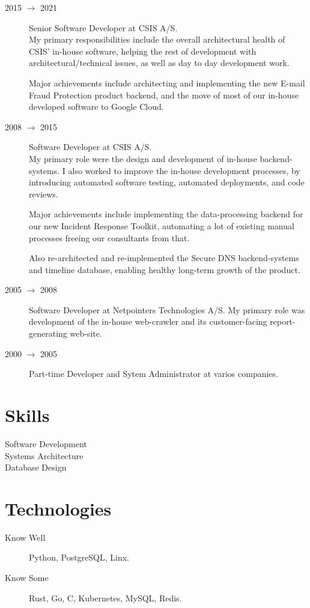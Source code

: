 \documentclass[margin,line,a4paper]{resume}
\begin{document}
\begin{resume}
\begin{description}
\item[2015 $\rightarrow$ 2021] Senior Software Developer at CSIS A/S. \\
My primary responsibilities include the overall architectural health of CSIS'
in-house software, helping the rest of development with
architectural/technical issues, as well as day to day development work.

Major achievements include architecting and implementing the new
E-mail Fraud Protection product backend, and the move of most of our in-house
developed software to Google Cloud.

\item[2008 $\rightarrow$ 2015] Software Developer at CSIS A/S. \\
My primary role were the design and development of in-house backend-systems.
I also worked to improve the in-house development processes, by introducing
automated software testing, automated deployments, and code reviews.

Major achievements include implementing the data-processing backend for our
new Incident Response Toolkit, automating a lot of existing manual processes
freeing our consultants from that.

Also re-architected and re-implemented the Secure DNS backend-systems and
timeline database, enabling healthy long-term growth of the product.

\item[2005 $\rightarrow$ 2008] Software Developer at Netpointers Technologies
A/S. My primary role was development of the in-house web-crawler and its
customer-facing report-generating web-site.

\item[2000 $\rightarrow$ 2005] Part-time Developer and Sytem Administrator
at varios companies.
\end{description}


\section{\mysidestyle Skills}\vspace{1mm}
\begin{description}
\item[Software Development]
\item[Systems Architecture]
\item[Database Design]
\end{description}


\section{\mysidestyle Technologies}\vspace{1mm}
\begin{description}
\item[Know Well] Python, PostgreSQL, Linx.
\item[Know Some] Rust, Go, C, Kubernetes, MySQL, Redis.
\end{description}



\end{resume}
\end{document}
